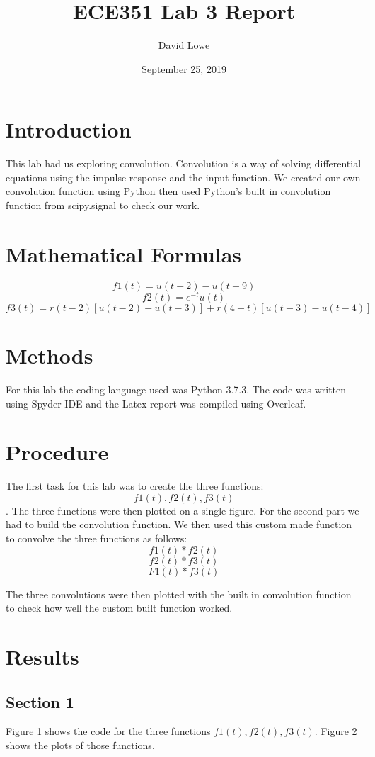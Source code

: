\documentclass{article}
\title{ECE351 Lab 3 Report}
\author{David Lowe }
\date{September 25, 2019}
\begin{document}
\maketitle

\section*{Introduction}
This lab had us exploring convolution. Convolution is a way of solving differential equations using the impulse response and the input function. We created our own convolution function using Python then used Python's built in convolution function from scipy.signal to check our work.

\section*{Mathematical Formulas}
$$f1(t)=u(t-2)-u(t-9)$$
$$f2(t)=e^{-t}u(t)$$
$$f3(t)=r(t-2)[u(t-2)-u(t-3)]+r(4-t)[u(t-3)-u(t-4)]$$

\section*{Methods}
For this lab the coding language used was Python 3.7.3. The code was written using Spyder IDE and the Latex report was compiled using Overleaf.

\section*{Procedure}
The first task for this lab was to create the three functions: $$f1(t), f2(t), f3(t)$$. The three functions were then plotted on a single figure. For the second part we had to build the convolution function. We then used this custom made function to convolve the three functions as follows:
$$f1(t)*f2(t)$$
$$f2(t)*f3(t)$$
$$F1(t)*f3(t)$$

The three convolutions were then plotted with the built in convolution function to check how well the custom built function worked.

\section*{Results}
\subsection*{Section 1}
Figure 1 shows the code for the three functions $f1(t), f2(t), f3(t)$. Figure 2 shows the plots of those functions.
\end{document}
